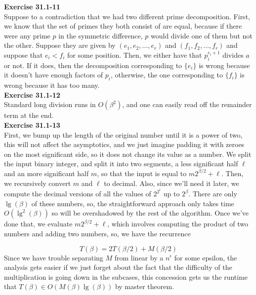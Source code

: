 \documentclass{article}
\begin{document}
\noindent\textbf{Exercise 31.1-11}\\

Suppose to a contradiction that we had two different prime decomposition. First, we know that the set of primes they both consist of are equal, because if there were any prime $p$ in the symmetric difference, $p$ would divide one of them but not the other. Suppose they are given by $(e_1,e_2, \ldots,e_r)$ and $(f_1,f_2,\ldots,f_r)$ and suppose that $e_i < f_i$ for some position. Then, we either have that $p_i^{e_i+1}$ divides $a$ or not. If it does, then the decomposition corresponding to $\{e_i\}$ is wrong because it doesn't have enough factors of $p_i$, otherwise, the one corresponding to $\{f_i\}$ is wrong because it has too many.\\

\noindent\textbf{Exercise 31.1-12}\\

Standard long division runs in $O(\beta^2)$, and one can easily read off the remainder term at the end. \\

\noindent\textbf{Exercise 31.1-13}\\

First, we bump up the length of the original number until it is a power of two, this will not affect the asymptotics, and we just imagine padding it with zeroes on the most significant side, so it does not change its value as a number. We split the input binary integer, and split it into two segments, a less significant half $\ell$ and an more significant half $m$, so that the input is equal to $m2^{\beta/2} + \ell$. Then, we recursively convert $m$ and $\ell$ to decimal. Also, since we'll need it later, we compute the decimal versions of all the values of $2^{2^i}$ up to $2^{\beta}$. There are only $\lg(\beta)$ of these numbers, so, the straightforward approach only takes time $O(\lg^2(\beta))$ so will be overshadowed by the rest of the algorithm. Once we've done that, we evaluate $m2^{\beta/2} + \ell$, which involves computing the product of two numbers and adding two numbers, so, we have the recurrence

\[
T( \beta) = 2T(\beta/2) + M(\beta/2)
\]
Since we have trouble separating $M$ from linear by a $n^{\epsilon}$ for some epsilon, the analysis gets easier if we just forget about the fact that the difficulty of the multiplication is going down in the subcases, this concession gets us the runtime that $T(\beta) \in O(M(\beta) \lg(\beta))$ by master theorem.
\end{document}
